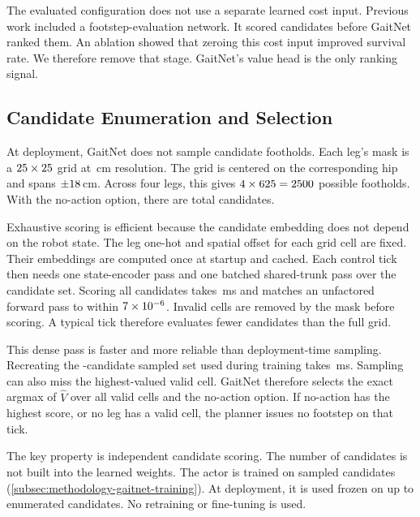 The evaluated configuration does not use a separate learned cost
input. Previous work \cite{Sullivan2025} included a
footstep-evaluation network. It scored candidates before GaitNet
ranked them. An ablation showed that zeroing this cost input improved
survival rate. We therefore remove that stage. GaitNet's value head is
the only ranking signal.

\subsection{Candidate Enumeration and Selection}
\label{subsec:methodology-gaitnet-selection}

At deployment, GaitNet does not sample candidate footholds. Each leg's
mask is a $25 \times 25$ grid at
\corlMaskResolutionCm\,cm resolution. The grid is centered on the
corresponding hip and spans $\pm18$\,cm. Across four
legs, this gives $4 \times 625 =
2500$ possible footholds. With the no-action option,
there are \corlTotalCandidatesDense{} total candidates.

Exhaustive scoring is efficient because the candidate embedding does
not depend on the robot state. The leg one-hot and spatial offset for
each grid cell are fixed. Their embeddings are computed once at
startup and cached. Each control tick then needs one state-encoder
pass and one batched shared-trunk pass over the candidate set. Scoring
all \corlTotalCandidatesDense{} candidates takes \corlDenseScoreMs\,ms
and matches an unfactored forward pass to within
$7 \times 10^{-6}$. Invalid cells are removed by the mask before
scoring. A typical tick therefore evaluates fewer candidates than the
full grid.

This dense pass is faster and more reliable than deployment-time
sampling. Recreating the \corlTrainTotalCandidates{}-candidate sampled
set used during training takes \corlSampledScoreMs\,ms. Sampling can
also miss the highest-valued valid cell. GaitNet therefore selects the
exact argmax of $\hat{V}$ over all valid cells and the no-action
option. If no-action has the highest score, or no leg has a valid
cell, the planner issues no footstep on that tick.

The key property is independent candidate scoring. The number of
candidates is not built into the learned weights. The actor is trained
on \corlTrainTotalCandidates{} sampled candidates
(\autoref{subsec:methodology-gaitnet-training}). At deployment, it is
used frozen on up to \corlTotalCandidatesDense{} enumerated
candidates. No retraining or fine-tuning is used.

